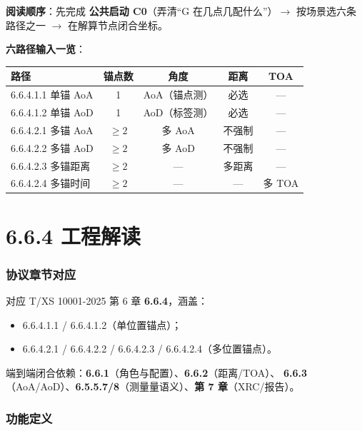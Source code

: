 \documentclass[11pt,a4paper]{ctexart}
\begin{document}
\textbf{阅读顺序}：先完成 \textbf{公共启动 C0}（弄清``G 在几点几配什么''）$\rightarrow$
按场景选六条路径之一 $\rightarrow$ 在解算节点闭合坐标。

\textbf{六路径输入一览}：

\begin{table}[h]
\centering
\small
\begin{tabular}{lcccc}
\toprule
\textbf{路径} & \textbf{锚点数} & \textbf{角度} & \textbf{距离} & \textbf{TOA} \\
\midrule
6.6.4.1.1 单锚 AoA & 1 & AoA（锚点测） & 必选 & --- \\
6.6.4.1.2 单锚 AoD & 1 & AoD（标签测） & 必选 & --- \\
6.6.4.2.1 多锚 AoA & $\ge 2$ & 多 AoA & 不强制 & --- \\
6.6.4.2.2 多锚 AoD & $\ge 2$ & 多 AoD & 不强制 & --- \\
6.6.4.2.3 多锚距离 & $\ge 2$ & --- & 多距离 & --- \\
6.6.4.2.4 多锚时间 & $\ge 2$ & --- & --- & 多 TOA \\
\bottomrule
\end{tabular}
\end{table}

\newpage
\part{6.6.4 工程解读}

\section{协议章节对应}

对应 T/XS 10001-2025 第 6 章 \textbf{6.6.4}，涵盖：
\begin{itemize}[nosep]
  \item 6.6.4.1.1 / 6.6.4.1.2（单位置锚点）；
  \item 6.6.4.2.1 / 6.6.4.2.2 / 6.6.4.2.3 / 6.6.4.2.4（多位置锚点）。
\end{itemize}
端到端闭合依赖：\textbf{6.6.1}（角色与配置）、\textbf{6.6.2}（距离/TOA）、
\textbf{6.6.3}（AoA/AoD）、\textbf{6.5.5.7/8}（测量量语义）、\textbf{第 7 章}（XRC/报告）。

\section{功能定义}
\end{document}
